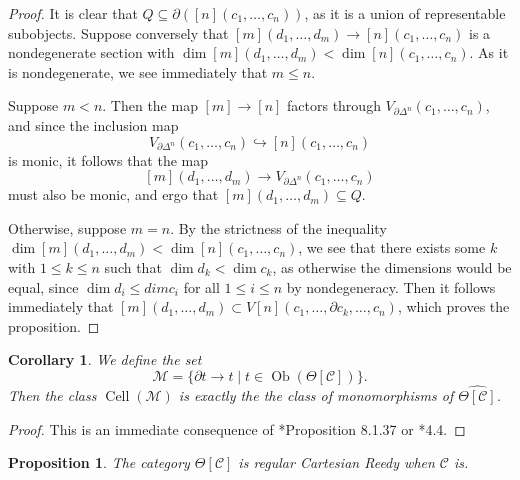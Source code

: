 \documentclass[a4paper]{article}
\numberwithin{equation}{subsection}
\theoremstyle{plain}   %
\newtheorem{prop}[equation]{Proposition}
\newtheorem{cor}[equation]{Corollary}
\theoremstyle{definition}
\theoremstyle{remark}
\theoremstyle{plain}
\DeclareMathOperator{\Ob}{Ob}
\providecommand{\C}{}
\renewcommand{\C}{\ensuremath{\mathcal{C}}}
\newcommand{\cellset}{\ensuremath{\widehat{\Theta[\mathcal{C}]}}}
\begin{document}
\begin{proof}
	It is clear that \(Q\subseteq \partial ([n](c_1,\dots,c_n))\), as it is a union of representable subobjects.  Suppose conversely that \([m](d_1,\dots,d_m) \to [n](c_1,\dots,c_n)\) is a nondegenerate section with \(\dim [m](d_1,\dots,d_m) < \dim [n](c_1,\dots,c_n)\).  As it is nondegenerate, we see immediately that \(m\leq n\).  
	
	Suppose \(m<n\).  Then the map \([m]\to [n]\) factors through \(V_{\partial \Delta^n}(c_1,\dots,c_n)\), and since the inclusion map 
	\[
		V_{\partial \Delta^n}(c_1,\dots,c_n) \hookrightarrow [n](c_1,\dots,c_n)
	\]
	is monic, it follows that the map 
	\[
		[m](d_1,\dots,d_m)\to V_{\partial \Delta^n}(c_1,\dots,c_n)
	\]
	must also be monic, and ergo that \([m](d_1,\dots,d_m)\subseteq Q\).
	
	Otherwise, suppose \(m=n\).  By the strictness of the inequality \(\dim [m](d_1,\dots,d_m) < \dim [n](c_1,\dots,c_n)\), we see that there exists some \(k\) with \(1\leq k \leq n\) such that \(\dim d_k < \dim c_k\), as otherwise the dimensions would be equal, since \(\dim d_i \leq dim c_i\) for all \(1\leq i \leq n\) by nondegeneracy.  Then it follows immediately that \([m](d_1,\dots,d_m) \subset V[n](c_1,\dots,\partial c_k, \dots, c_n)\), which proves the proposition.
\end{proof}
\begin{cor} 
	We define the set
	\[\mathscr{M}=\{\partial t \to t \mid t \in \Ob(\Theta[\C])\}.\]  Then the class \(\operatorname{Cell}(\mathscr{M})\) is exactly the the class of monomorphisms of \(\cellset\).  
\end{cor}
\begin{proof}
	This is an immediate consequence of \cite{cisinski-book}*{Proposition 8.1.37} or \cite{bergner-rezk-reedy}*{4.4}.
\end{proof}
\begin{prop}
	The category \(\Theta[\C]\) is regular Cartesian Reedy when \(\C\) is.
\end{prop}
\end{document}
